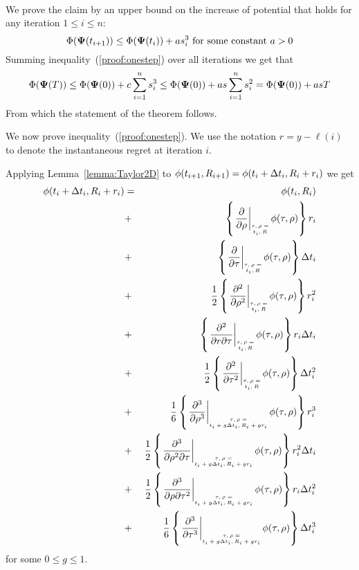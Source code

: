\documentclass{article}[12pt]
\begin{document}
{\\
We prove the claim by an upper bound on the increase of potential that holds for any iteration $1 \leq i \leq n$:
\begin{equation} \label{proof:onestep}
\Phi({\bf \Psi}(t_{i+1})) \leq \Phi({\bf \Psi}(t_i)) + a s_i^3 \mbox{ for some constant } a>0
\end{equation}
Summing inequality~(\ref{proof:onestep}) over all iterations we get that 
\begin{equation} \label{proof:allsteps}
\Phi({\bf \Psi}(T)) \leq \Phi({\bf \Psi}(0)) + c \sum_{i=1}^n s_i^3 \leq 
\Phi({\bf \Psi}(0)) + a s \sum_{i=1}^n s_i^2 = 
\Phi({\bf \Psi}(0)) + a s T
\end{equation}
From which the statement of the theorem follows.

We now prove inequality~(\ref{proof:onestep}). 
We use the notation $r=y -\ell(i)$ to denote the instantaneous regret at iteration $i$. 


Applying Lemma~\ref{lemma:Taylor2D} to
$\phi(t_{i+1},R_{i+1})=\phi(t_i+\Delta t_i,R_i+r_i)$  we get
\begin{eqnarray} 
    \pot(t_i+\deltat_i,\R_i+r_i) & =&  
    \pot(t_i,\R_i)\\
    &+&\at{\frac{\partial}{\partial \rho}} r_i \\
    &+&\at{\frac{\partial}{\partial \tau}}  \deltat_i \\
    &+& \frac{1}{2} \at{\frac{\partial^2}{\partial \rho^2}} r_i^2 \\
    &+& \at{\frac{\partial^2}{\partial r \partial \tau}} r_i \deltat_i \label{term:Taylor_rdt}\\
    &+& \frac{1}{2} \at{\frac{\partial^2}{\partial \tau^2}} \deltat_i^2 \label{term:Taylor_dtsquare}\\
    &+& \frac{1}{6} \att{\frac{\partial^3}{\partial \rho^3}} r_i^3 \label{term:Taylor_r3}\\
    &+& \frac{1}{2} \att{\frac{\partial^3}{\partial \rho^2 \partial \tau}} r_i^2\deltat_i \label{term:Taylor_r2t}\\
    &+& \frac{1}{2} \att{\frac{\partial^3}{\partial \rho \partial \tau^2}} r_i\deltat_i^2 \label{term:Taylor_rt2}\\
    &+& \frac{1}{6} \att{\frac{\partial^3}{\partial \tau^3}} \deltat_i^3 \label{term:Taylor_t3}
\end{eqnarray}
for some $0 \leq g \leq 1$.

}
\end{document}

